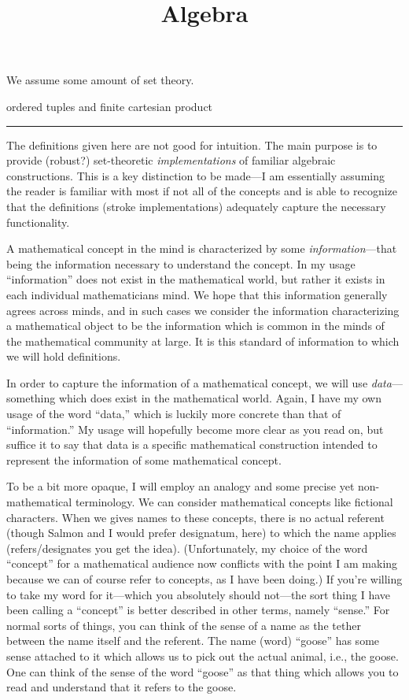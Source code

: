 \documentclass[12pt]{article}
\title{Algebra \\
    \large 
}
\author{}
\date{}
\newcommand{\sepline}{\rule{\textwidth}{0.4pt}}
\theoremstyle{definition}
\newcommand{\<}{\left\langle}
\renewcommand{\>}{\right\rangle}
\begin{document}
We assume some amount of set theory.

ordered tuples and finite cartesian product

\sepline

The definitions given here are not good for intuition.
The main purpose is to provide (robust?) set-theoretic \emph{implementations} of familiar algebraic constructions.
This is a key distinction to be made---I am essentially assuming the reader is familiar with most if not all of the concepts and is able to recognize that the definitions (stroke implementations) adequately capture the necessary functionality.

A mathematical concept in the mind is characterized by some \emph{information}---that being the information necessary to understand the concept.
In my usage ``information'' does not exist in the mathematical world, but rather it exists in each individual mathematicians mind.
We hope that this information generally agrees across minds, and in such cases we consider the information characterizing a mathematical object to be the information which is common in the minds of the mathematical community at large.
It is this standard of information to which we will hold definitions.

In order to capture the information of a mathematical concept, we will use \emph{data}---something which does exist in the mathematical world.
Again, I have my own usage of the word ``data,'' which is luckily more concrete than that of ``information.''
My usage will hopefully become more clear as you read on, but suffice it to say that data is a specific mathematical construction intended to represent the information of some mathematical concept.

To be a bit more opaque, I will employ an analogy and some precise yet non-mathematical terminology.
We can consider mathematical concepts like fictional characters.
When we gives names to these concepts, there is no actual referent (though Salmon and I would prefer designatum, here) to which the name applies (refers/designates you get the idea).
(Unfortunately, my choice of the word ``concept'' for a mathematical audience now conflicts with the point I am making because we can of course refer to concepts, as I have been doing.)
If you're willing to take my word for it---which you absolutely should not---the sort thing I have been calling a ``concept'' is better described in other terms, namely ``sense.''
For normal sorts of things, you can think of the sense of a name as the tether between the name itself and the referent.
The name (word) ``goose'' has some sense attached to it which allows us to pick out the actual animal, i.e., the goose.
One can think of the sense of the word ``goose'' as that thing which allows you to read and understand that it refers to the goose.
\end{document}
